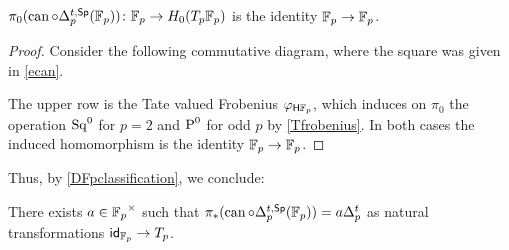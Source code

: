 \begin{lemma}
	\(\pi_0(\operatorname{can} \circ \Delta_p^{t,\mathsf{Sp}}({\mathbb{F}_p})) \colon {\mathbb{F}_p} \to H_0(T_p{\mathbb{F}_p})\) is the identity \({\mathbb{F}_p} \to {\mathbb{F}_p}\).
\end{lemma}

\begin{proof}
	Consider the following commutative diagram, where the square was given in \cref{ecan}.
	\begin{center}
	\end{center}
	
	The upper row is the Tate valued Frobenius \(\varphi_{\mathsf{H} {\mathbb{F}_p}}\), which induces on \(\pi_0\) the operation \(\operatorname{Sq}^0\) for \(p=2\) and \(\operatorname{P}^0\) for odd \(p\) by \cref{Tfrobenius}.
	In both cases the induced homomorphism is the identity \({\mathbb{F}_p}\to {\mathbb{F}_p}\).
\end{proof}

Thus, by \cref{DFpclassification}, we conclude:

\begin{corollary}
	There exists \(a\in{\mathbb{F}_p}^\times\) such that \(\pi_*(\operatorname{can} \circ \Delta_p^{t,\mathsf{Sp}}({\mathbb{F}_p})) = a \Delta_p^t\) as natural transformations \(\mathsf{id}_{{\mathbb{F}_p}}\to T_p\).
\end{corollary}

